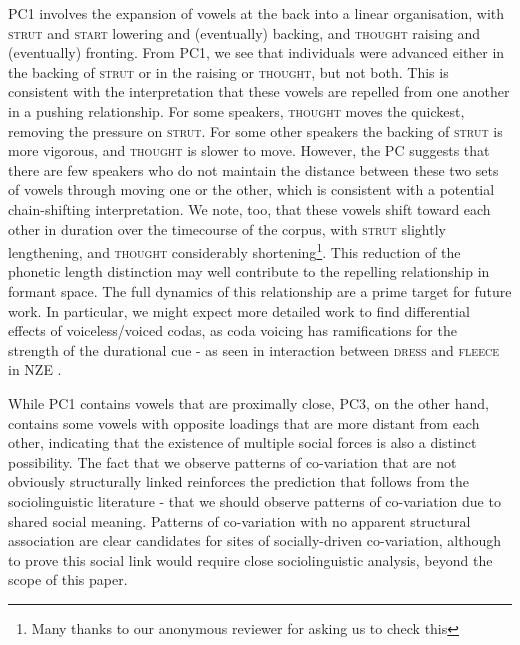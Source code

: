 \documentclass[review]{elsarticle} %
\begin{document}
PC1 involves the expansion of vowels at the back into a linear organisation, with \textsc{strut} and \textsc{start} lowering and (eventually) backing, and \textsc{thought} raising and (eventually) fronting.  From PC1, we see that individuals were advanced either in the backing of \textsc{strut} or in the raising or \textsc{thought}, but not both.  This is consistent with the interpretation that these vowels are repelled from one another in a pushing relationship.  For some speakers, \textsc{thought} moves the quickest, removing the pressure on \textsc{strut}.   For some other speakers the backing of \textsc{strut} is more vigorous, and \textsc{thought} is slower to move. However, the PC suggests that there are few speakers who do not maintain the distance between these two sets of vowels through moving one or the other, which is consistent with a potential chain-shifting interpretation.  We note, too, that these vowels shift toward each other in duration over the timecourse of the corpus, with \textsc{strut} slightly lengthening, and \textsc{thought} considerably shortening\footnote{Many thanks to our anonymous reviewer for asking us to check this}. This reduction of the phonetic length distinction may well contribute to the repelling relationship in formant space. The full dynamics of this relationship are a prime target for future work. In particular, we might expect more detailed work to find differential effects of voiceless/voiced codas, as coda voicing has ramifications for the strength of the durational cue - as seen in interaction between \textsc{dress} and \textsc{fleece} in NZE \citep{maclagan2007getting}.

While PC1 contains vowels that are proximally close,  PC3, on the other hand, contains some vowels with opposite loadings that are more distant from each other, indicating that the existence of multiple social forces is also a distinct possibility.  The fact that we observe patterns of co-variation that are not obviously structurally linked  reinforces the prediction that follows from the sociolinguistic literature - that we should observe patterns of co-variation due to shared social meaning.  Patterns of co-variation with no apparent structural association are clear candidates for sites of socially-driven co-variation, although to prove this social link would require close sociolinguistic analysis, beyond the scope of this paper.
\end{document}
